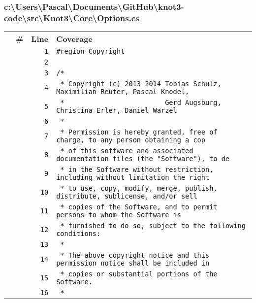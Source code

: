 \documentclass[a4paper,10pt]{article}
\begin{document}
\subsubsection{c:\textbackslash Users\textbackslash Pascal\textbackslash Documents\textbackslash GitHub\textbackslash knot3-code\textbackslash src\textbackslash Knot3\textbackslash Core\textbackslash Options.cs}
\begin{longtable}[l]{lrrl}
\textbf{} & \textbf{\#} & \textbf{Line} & \textbf{Coverage}\\
\cellcolor{gray} &  & \verb~1~ & \verb~#region Copyright~\\
\cellcolor{gray} &  & \verb~2~ & \verb~~\\
\cellcolor{gray} &  & \verb~3~ & \verb~/*~\\
\cellcolor{gray} &  & \verb~4~ & \verb~ * Copyright (c) 2013-2014 Tobias Schulz, Maximilian Reuter, Pascal Knodel,~\\
\cellcolor{gray} &  & \verb~5~ & \verb~ *                         Gerd Augsburg, Christina Erler, Daniel Warzel~\\
\cellcolor{gray} &  & \verb~6~ & \verb~ *~\\
\cellcolor{gray} &  & \verb~7~ & \verb~ * Permission is hereby granted, free of charge, to any person obtaining a cop~\\
\cellcolor{gray} &  & \verb~8~ & \verb~ * of this software and associated documentation files (the "Software"), to de~\\
\cellcolor{gray} &  & \verb~9~ & \verb~ * in the Software without restriction, including without limitation the right~\\
\cellcolor{gray} &  & \verb~10~ & \verb~ * to use, copy, modify, merge, publish, distribute, sublicense, and/or sell~\\
\cellcolor{gray} &  & \verb~11~ & \verb~ * copies of the Software, and to permit persons to whom the Software is~\\
\cellcolor{gray} &  & \verb~12~ & \verb~ * furnished to do so, subject to the following conditions:~\\
\cellcolor{gray} &  & \verb~13~ & \verb~ *~\\
\cellcolor{gray} &  & \verb~14~ & \verb~ * The above copyright notice and this permission notice shall be included in ~\\
\cellcolor{gray} &  & \verb~15~ & \verb~ * copies or substantial portions of the Software.~\\
\cellcolor{gray} &  & \verb~16~ & \verb~ *~\\

\end{longtable}
\end{document}
